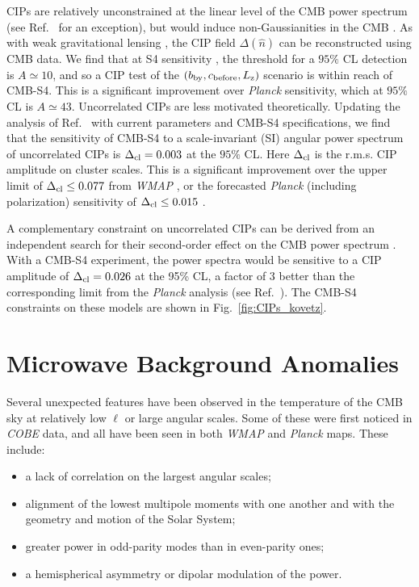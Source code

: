 CIPs are relatively unconstrained at the linear level of the CMB power spectrum (see Ref.~\cite{Munoz:2015fdv} for an exception), but would induce non-Gaussianities in the CMB \cite{Grin:2011nk,Grin:2011tf,Grin:2013uya,He:2015msa}. As with weak gravitational lensing \cite{Hu:2001kj}, the CIP field $\Delta(\hat{n})$ can be reconstructed using CMB data. We find that at S4 sensitivity \cite{He:2015msa}, the threshold for a $95\%$ CL detection is $A\simeq 10$, and so a CIP test of the $(b_{\rm by}, c_{\rm before}, L_{\rm z})$ scenario is within reach of CMB-S4. This is a significant improvement over \emph{Planck} sensitivity, which at $95\%$ CL is $A\simeq 43$. Uncorrelated CIPs are less  motivated theoretically. Updating the analysis of Ref.~\cite{He:2015msa} with current parameters \cite{Ade:2015lrj} and CMB-S4 specifications, we find that the sensitivity of CMB-S4 to a scale-invariant (SI) angular power spectrum of uncorrelated CIPs is $\Delta_{\rm cl}=0.003$ at the $95\%$ CL. Here $\Delta_{\rm cl}$ is the r.m.s. CIP amplitude on cluster scales. This is a significant improvement over the upper limit of $\Delta_{\rm cl}\leq 0.077$ from {\it WMAP\/} \cite{Grin:2013uya}, or the forecasted {\it Planck\/} \cite{Ade:2015lrj} (including polarization) sensitivity of $\Delta_{\rm cl}\leq 0.015$ \cite{He:2015msa}. 

A complementary constraint on uncorrelated CIPs can be derived from an independent search for their second-order effect on the CMB power spectrum \cite{Munoz:2015fdv}. With a CMB-S4 experiment, the power spectra would be sensitive to a CIP amplitude of $\Delta_{\rm cl} = 0.026$ at the 95\% CL, a factor of 3 better than the corresponding limit from the {\it Planck\/} analysis (see Ref.~\cite{Munoz:2015fdv}). The CMB-S4 constraints on these models are shown in Fig.~\ref{fig:CIPs_kovetz}.


\section{Microwave Background Anomalies}

Several unexpected features have been observed in the temperature of the CMB sky at relatively low $\ell$ or large angular scales.  Some of these were first noticed in {\it COBE\/} data,  
and all have been seen in both {\it WMAP\/} and {\it Planck\/} maps.  These include: 
\begin{itemize}
  \item a lack of correlation on the largest angular scales;
  \item alignment of the lowest multipole moments with one another and with the geometry and motion of the Solar System;
 \item greater power in odd-parity modes than in even-parity ones;
  \item a hemispherical asymmetry or dipolar modulation of the power.
\end{itemize}

